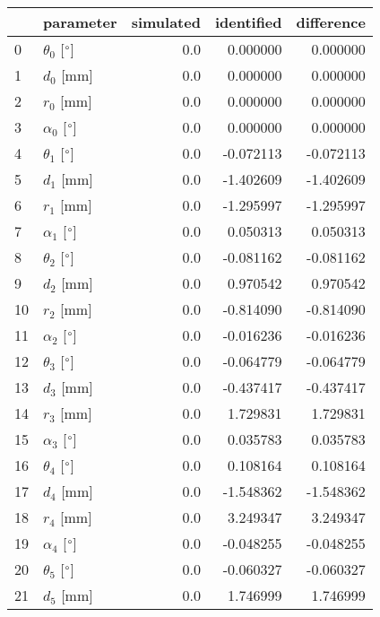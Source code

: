 \documentclass{standalone}%
\begin{document}
%
\normalsize%
\begin{tabular}{llrrr}
\toprule
{} &                 parameter & simulated & identified & difference \\
\midrule
0  &  $\theta_{0}$ [$\degree$] &       0.0 &   0.000000 &   0.000000 \\
1  &              $d_{0}$ [mm] &       0.0 &   0.000000 &   0.000000 \\
2  &              $r_{0}$ [mm] &       0.0 &   0.000000 &   0.000000 \\
3  &  $\alpha_{0}$ [$\degree$] &       0.0 &   0.000000 &   0.000000 \\
4  &  $\theta_{1}$ [$\degree$] &       0.0 &  -0.072113 &  -0.072113 \\
5  &              $d_{1}$ [mm] &       0.0 &  -1.402609 &  -1.402609 \\
6  &              $r_{1}$ [mm] &       0.0 &  -1.295997 &  -1.295997 \\
7  &  $\alpha_{1}$ [$\degree$] &       0.0 &   0.050313 &   0.050313 \\
8  &  $\theta_{2}$ [$\degree$] &       0.0 &  -0.081162 &  -0.081162 \\
9  &              $d_{2}$ [mm] &       0.0 &   0.970542 &   0.970542 \\
10 &              $r_{2}$ [mm] &       0.0 &  -0.814090 &  -0.814090 \\
11 &  $\alpha_{2}$ [$\degree$] &       0.0 &  -0.016236 &  -0.016236 \\
12 &  $\theta_{3}$ [$\degree$] &       0.0 &  -0.064779 &  -0.064779 \\
13 &              $d_{3}$ [mm] &       0.0 &  -0.437417 &  -0.437417 \\
14 &              $r_{3}$ [mm] &       0.0 &   1.729831 &   1.729831 \\
15 &  $\alpha_{3}$ [$\degree$] &       0.0 &   0.035783 &   0.035783 \\
16 &  $\theta_{4}$ [$\degree$] &       0.0 &   0.108164 &   0.108164 \\
17 &              $d_{4}$ [mm] &       0.0 &  -1.548362 &  -1.548362 \\
18 &              $r_{4}$ [mm] &       0.0 &   3.249347 &   3.249347 \\
19 &  $\alpha_{4}$ [$\degree$] &       0.0 &  -0.048255 &  -0.048255 \\
20 &  $\theta_{5}$ [$\degree$] &       0.0 &  -0.060327 &  -0.060327 \\
21 &              $d_{5}$ [mm] &       0.0 &   1.746999 &   1.746999 \\

\end{tabular}
\end{document}
